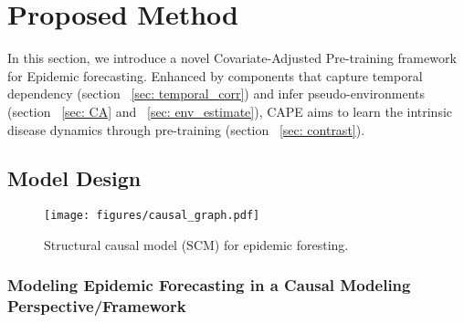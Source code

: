 \section{Proposed Method}



 In this section, we introduce a novel Covariate-Adjusted Pre-training framework for Epidemic forecasting. Enhanced by components that capture temporal dependency (section ~\ref{sec: temporal_corr}) and infer pseudo-environments (section ~\ref{sec: CA} and ~\ref{sec: env_estimate}), CAPE aims to learn the intrinsic disease dynamics through pre-training (section ~\ref{sec: contrast}).


\subsection{Model Design}


\begin{figure}[t]
\centering
\texttt{[image: figures/causal\_graph.pdf]}
\caption{ Structural causal model (SCM) for epidemic foresting.}
\label{fig: causal_graph}
\end{figure}



\subsubsection{Modeling Epidemic Forecasting in a Causal Modeling Perspective/Framework}

